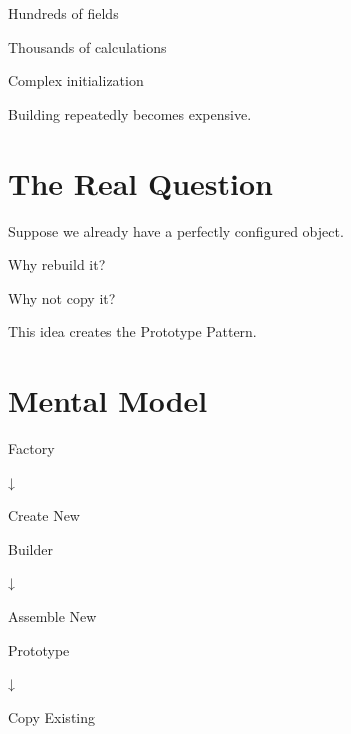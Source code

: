 \documentclass[11pt,a4paper]{book}
\begin{document}
Hundreds of fields


Thousands of calculations


Complex initialization


Building repeatedly becomes
expensive.


\section{The Real Question}

Suppose we already have
a perfectly configured object.


Why rebuild it?


Why not copy it?


This idea creates the
Prototype Pattern.


\section{Mental Model}

\begin{mentalmodel}

Factory

↓

Create New

\vspace{0.5em}

Builder

↓

Assemble New

\vspace{0.5em}

Prototype

↓

Copy Existing

\end{mentalmodel}
\end{document}
